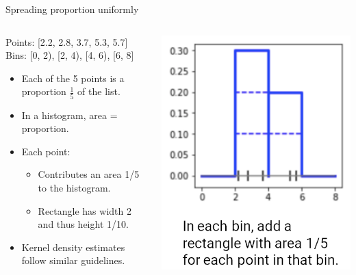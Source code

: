 \documentclass[aspectratio=169]{../latex_main/tntbeamer}  %
\begin{document}
	
	\begin{frame}{Spreading proportion uniformly}
	    \begin{columns}
	        \begin{column}{.55\textwidth}
	        
	            Points:  [2.2, 2.8, 3.7, 5.3, 5.7]\\
                Bins: [0, 2), [2, 4), [4, 6), [6, 8]

	               \begin{itemize}
	                   \item Each of the 5 points is a proportion $\frac{1}{5}$ of the list.
	                   \item In a histogram, area = proportion.
	                   \item Each point:
	                   \begin{itemize}
	                       \item Contributes an area 1/5 to the histogram.
	                       \item Rectangle has width 2 and thus height 1/10. 
	                   \end{itemize}
	                   \item Kernel density estimates follow similar guidelines.
	               \end{itemize} 
	        \end{column}
	        
	        
	        \begin{column}{.5\textwidth}

	                    \centering
	                    \includegraphics[scale=.4]{Bild83}

	        \end{column}
	    \end{columns}
	\end{frame}
	
\end{document}
